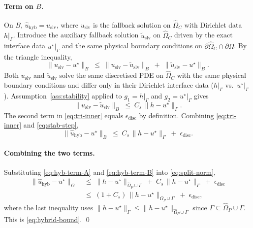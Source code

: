 \paragraph{Term on $B$.}
On $B$, $\widehat{u}_{\mathrm{hyb}}=u_{\mathrm{slv}}$, where
$u_{\mathrm{slv}}$ is the fallback solution on $\widehat{\Omega}_C$ with
Dirichlet data $h\big|_\Gamma$. Introduce the auxiliary fallback
solution $\widetilde{u}_{\mathrm{slv}}$ on $\widehat{\Omega}_C$ driven
by the exact interface data $u^\star\big|_\Gamma$ and the same physical
boundary conditions on $\partial\widehat{\Omega}_C\cap\partial\Omega$.
By the triangle inequality,
\begin{equation}
  \bigl\|u_{\mathrm{slv}}-u^\star\bigr\|_{B}
  \;\leq\;
  \bigl\|u_{\mathrm{slv}}-\widetilde{u}_{\mathrm{slv}}\bigr\|_{B}
  \;+\;
  \bigl\|\widetilde{u}_{\mathrm{slv}}-u^\star\bigr\|_{B}.
  \label{eq:tri-inner}
\end{equation}
Both $u_{\mathrm{slv}}$ and $\widetilde{u}_{\mathrm{slv}}$ solve the
same discretised PDE on $\widehat{\Omega}_C$ with the same physical
boundary conditions and differ only in their Dirichlet interface data
($h\big|_\Gamma$ vs.\ $u^\star\big|_\Gamma$). Assumption~\ref{ass:stability}
applied to $g_1=h\big|_\Gamma$ and $g_2=u^\star\big|_\Gamma$ gives
\begin{equation}
  \bigl\|u_{\mathrm{slv}}-\widetilde{u}_{\mathrm{slv}}\bigr\|_{B}
  \;\leq\;
  C_s\,\bigl\|h-u^\star\bigr\|_{\Gamma}.
  \label{eq:stab-step}
\end{equation}
The second term in \eqref{eq:tri-inner} equals
$\epsilon_{\mathrm{disc}}$ by definition. Combining \eqref{eq:tri-inner}
and \eqref{eq:stab-step},
\begin{equation}
  \bigl\|\widehat{u}_{\mathrm{hyb}}-u^\star\bigr\|_{B}
  \;\leq\;
  C_s\,\bigl\|h-u^\star\bigr\|_{\Gamma}
  \;+\;\epsilon_{\mathrm{disc}}.
  \label{eq:hyb-term-B}
\end{equation}

\paragraph{Combining the two terms.}
Substituting \eqref{eq:hyb-term-A} and \eqref{eq:hyb-term-B} into
\eqref{eq:split-norm},
\begin{align*}
  \bigl\|\widehat{u}_{\mathrm{hyb}}-u^\star\bigr\|_{\Omega}
  &\;\leq\;
  \bigl\|h-u^\star\bigr\|_{\widehat{\Omega}_P\cup\Gamma}
  \;+\;C_s\,\bigl\|h-u^\star\bigr\|_{\Gamma}
  \;+\;\epsilon_{\mathrm{disc}}\\
  &\;\leq\;
  (1+C_s)\,\bigl\|h-u^\star\bigr\|_{\widehat{\Omega}_P\cup\Gamma}
  \;+\;\epsilon_{\mathrm{disc}},
\end{align*}
where the last inequality uses
$\|h-u^\star\|_{\Gamma}\leq\|h-u^\star\|_{\widehat{\Omega}_P\cup\Gamma}$
since $\Gamma\subseteq\widehat{\Omega}_P\cup\Gamma$. This is
\eqref{eq:hybrid-bound}. \qed

